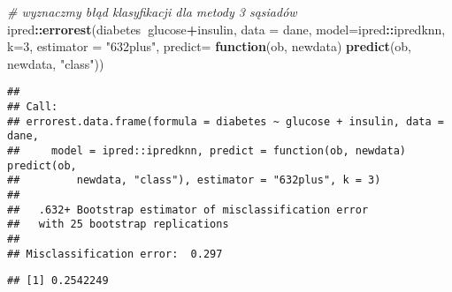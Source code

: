 \documentclass[polish,]{book}
\newenvironment{Shaded}{\begin{snugshade}}{\end{snugshade}}
\newcommand{\CommentTok}[1]{\textcolor[rgb]{0.56,0.35,0.01}{\textit{#1}}}
\newcommand{\ControlFlowTok}[1]{\textcolor[rgb]{0.13,0.29,0.53}{\textbf{#1}}}
\newcommand{\DataTypeTok}[1]{\textcolor[rgb]{0.13,0.29,0.53}{#1}}
\newcommand{\DecValTok}[1]{\textcolor[rgb]{0.00,0.00,0.81}{#1}}
\newcommand{\KeywordTok}[1]{\textcolor[rgb]{0.13,0.29,0.53}{\textbf{#1}}}
\newcommand{\NormalTok}[1]{#1}
\newcommand{\OperatorTok}[1]{\textcolor[rgb]{0.81,0.36,0.00}{\textbf{#1}}}
\newcommand{\StringTok}[1]{\textcolor[rgb]{0.31,0.60,0.02}{#1}}
\begin{document}
\begin{Shaded}
\begin{Highlighting}[]
\CommentTok{# wyznaczmy błąd klasyfikacji dla metody 3 sąsiadów}
\NormalTok{ipred}\OperatorTok{::}\KeywordTok{errorest}\NormalTok{(diabetes}\OperatorTok{~}\NormalTok{glucose}\OperatorTok{+}\NormalTok{insulin, }\DataTypeTok{data =}\NormalTok{ dane, }\DataTypeTok{model=}\NormalTok{ipred}\OperatorTok{::}\NormalTok{ipredknn, }\DataTypeTok{k=}\DecValTok{3}\NormalTok{,}
                \DataTypeTok{estimator =} \StringTok{"632plus"}\NormalTok{,}
                \DataTypeTok{predict=} \ControlFlowTok{function}\NormalTok{(ob, newdata) }\KeywordTok{predict}\NormalTok{(ob, newdata, }\StringTok{"class"}\NormalTok{))}
\end{Highlighting}
\end{Shaded}

\begin{verbatim}
## 
## Call:
## errorest.data.frame(formula = diabetes ~ glucose + insulin, data = dane, 
##     model = ipred::ipredknn, predict = function(ob, newdata) predict(ob, 
##         newdata, "class"), estimator = "632plus", k = 3)
## 
##   .632+ Bootstrap estimator of misclassification error 
##   with 25 bootstrap replications
## 
## Misclassification error:  0.297
\end{verbatim}

\begin{Shaded}
\end{Shaded}

\begin{verbatim}
## [1] 0.2542249
\end{verbatim}
\end{document}
